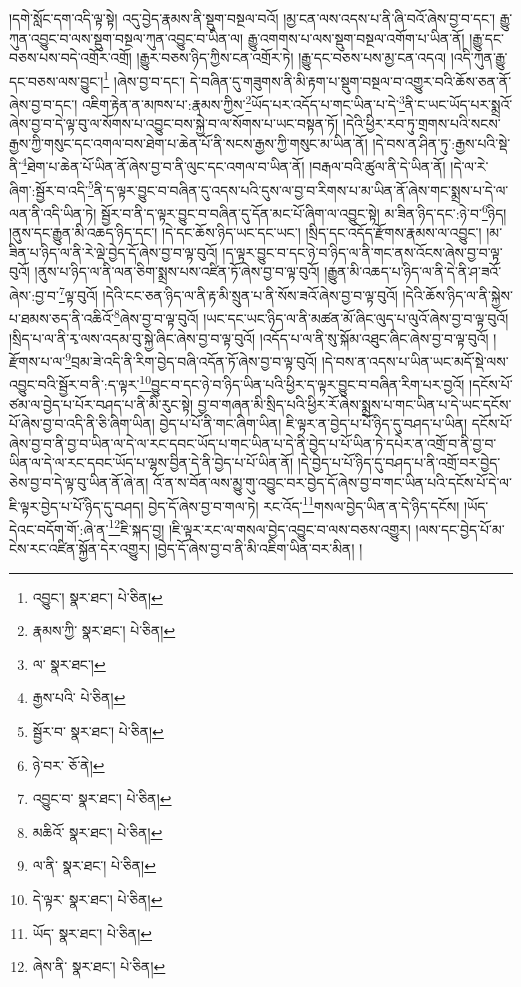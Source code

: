 །དགེ་སློང་དག་འདི་ལྟ་སྟེ། འདུ་བྱེད་རྣམས་ནི་སྡུག་བསྔལ་བའོ། །མྱ་ངན་ལས་འདས་པ་ནི་ཞི་བའོ་ཞེས་བྱ་བ་དང་། རྒྱུ་ཀུན་འབྱུང་བ་ལས་སྡུག་བསྔལ་ཀུན་འབྱུང་བ་ཡིན་ལ། རྒྱུ་འགགས་པ་ལས་སྡུག་བསྔལ་འགོག་པ་ཡིན་ནོ། །རྒྱུ་དང་བཅས་པས་བདེ་འགྲོར་འགྲོ། །རྒྱུར་བཅས་ཉིད་ཀྱིས་ངན་འགྲོར་ཏེ། །རྒྱུ་དང་བཅས་པས་མྱ་ངན་འདའ། །འདི་ཀུན་རྒྱུ་དང་བཅས་ལས་བྱུང་།\footnote{འབྱུང་།  སྣར་ཐང་།  པེ་ཅིན། } །ཞེས་བྱ་བ་དང་། དེ་བཞིན་དུ་གཟུགས་ནི་མི་རྟག་པ་སྡུག་བསྔལ་བ་འགྱུར་བའི་ཆོས་ཅན་ནོ་ཞེས་བྱ་བ་དང་། འཇིག་རྟེན་ན་མཁས་པ་:རྣམས་ཀྱིས་\footnote{རྣམས་ཀྱི་  སྣར་ཐང་།  པེ་ཅིན། }ཡོད་པར་འདོད་པ་གང་ཡིན་པ་དེ་\footnote{ལ་  སྣར་ཐང་། }ནི་ང་ཡང་ཡོད་པར་སྨྲའོ་ཞེས་བྱ་བ་དེ་ལྟ་བུ་ལ་སོགས་པ་འབྱུང་བས་སྐྱེ་བ་ལ་སོགས་པ་ཡང་བསྟན་ཏོ། །དེའི་ཕྱིར་རབ་ཏུ་གྲགས་པའི་སངས་རྒྱས་ཀྱི་གསུང་དང་འགལ་བས་ཐེག་པ་ཆེན་པོ་ནི་སངས་རྒྱས་ཀྱི་གསུང་མ་ཡིན་ནོ། །དེ་བས་ན་ཤིན་ཏུ་:རྒྱས་པའི་སྡེ་ནི་\footnote{རྒྱས་པའི་  པེ་ཅིན། }ཐེག་པ་ཆེན་པོ་ཡིན་ནོ་ཞེས་བྱ་བ་ནི་ལུང་དང་འགལ་བ་ཡིན་ནོ། །བརྒལ་བའི་ཚུལ་ནི་དེ་ཡིན་ནོ། །དེ་ལ་རེ་ཞིག་:སྦྱོར་བ་འདི་\footnote{སྦྱོར་བ་  སྣར་ཐང་།  པེ་ཅིན། }ནི་ད་ལྟར་བྱུང་བ་བཞིན་དུ་འདས་པའི་དུས་ལ་བྱ་བ་རིགས་པ་མ་ཡིན་ནོ་ཞེས་གང་སྨྲས་པ་དེ་ལ་ལན་ནི་འདི་ཡིན་ཏེ། སྦྱོར་བ་ནི་ད་ལྟར་བྱུང་བ་བཞིན་དུ་དོན་མང་པོ་ཞིག་ལ་འབྱུང་སྟེ། མ་ཟིན་ཉིད་དང་:ཉེ་བ་\footnote{ཉེ་བར་  ཅོ་ནེ། }ཉིད། །ནུས་དང་རྒྱུན་མི་འཆད་ཉིད་དང་། །དེ་དང་ཆོས་ཉིད་ཡང་དང་ཡང་། །སྲིད་དང་འདོད་རྫོགས་རྣམས་ལ་འབྱུང་། །མ་ཟིན་པ་ཉིད་ལ་ནི་རེ་ལྡེ་བྱེད་དོ་ཞེས་བྱ་བ་ལྟ་བུའོ། །ད་ལྟར་བྱུང་བ་དང་ཉེ་བ་ཉིད་ལ་ནི་གང་ནས་འོངས་ཞེས་བྱ་བ་ལྟ་བུའོ། །ནུས་པ་ཉིད་ལ་ནི་ལན་ཅིག་སྨྲས་པས་འཛིན་ཏོ་ཞེས་བྱ་བ་ལྟ་བུའོ། །རྒྱུན་མི་འཆད་པ་ཉིད་ལ་ནི་དེ་ནི་ཤ་ཟའོ་ཞེས་:བྱ་བ་\footnote{འབྱུང་བ་  སྣར་ཐང་།  པེ་ཅིན། }ལྟ་བུའོ། །དེའི་ངང་ཅན་ཉིད་ལ་ནི་རྟ་མི་སྲུན་པ་ནི་སོས་ཟའོ་ཞེས་བྱ་བ་ལྟ་བུའོ། །དེའི་ཆོས་ཉིད་ལ་ནི་སྐྱེས་པ་ཐམས་ཅད་ནི་འཆིའོ་\footnote{མཆིའོ་  སྣར་ཐང་།  པེ་ཅིན། }ཞེས་བྱ་བ་ལྟ་བུའོ། །ཡང་དང་ཡང་ཉིད་ལ་ནི་མཚན་མོ་ཞིང་ལུད་པ་ལུའོ་ཞེས་བྱ་བ་ལྟ་བུའོ། །སྲིད་པ་ལ་ནི་རྭ་ལས་འདམ་བུ་སྐྱེ་ཞིང་ཞེས་བྱ་བ་ལྟ་བུའོ། །འདོད་པ་ལ་ནི་སུ་སྐོམ་འཐུང་ཞིང་ཞེས་བྱ་བ་ལྟ་བུའོ། །རྫོགས་པ་ལ་\footnote{ལ་ནི་  སྣར་ཐང་།  པེ་ཅིན། }བྲམ་ཟེ་འདི་ནི་རིག་བྱེད་བཞི་འདོན་ཏོ་ཞེས་བྱ་བ་ལྟ་བུའོ། །དེ་བས་ན་འདས་པ་ཡིན་ཡང་མདོ་སྡེ་ལས་འབྱུང་བའི་སྦྱོར་བ་ནི་:ད་ལྟར་\footnote{དེ་ལྟར་  སྣར་ཐང་།  པེ་ཅིན། }བྱུང་བ་དང་ཉེ་བ་ཉིད་ཡིན་པའི་ཕྱིར་ད་ལྟར་བྱུང་བ་བཞིན་རིག་པར་བྱའོ། །དངོས་པོ་ཙམ་ལ་བྱེད་པ་པོར་བཤད་པ་ནི་མི་རུང་སྟེ། བྱ་བ་གཞན་མི་སྲིད་པའི་ཕྱིར་རོ་ཞེས་སྨྲས་པ་གང་ཡིན་པ་དེ་ཡང་དངོས་པོ་ཞེས་བྱ་བ་འདི་ནི་ཅི་ཞིག་ཡིན། བྱེད་པ་པོ་ནི་གང་ཞིག་ཡིན། ཇི་ལྟར་ན་བྱེད་པ་པོ་ཉིད་དུ་བཤད་པ་ཡིན། དངོས་པོ་ཞེས་བྱ་བ་ནི་བྱ་བ་ཡིན་ལ་དེ་ལ་རང་དབང་ཡོད་པ་གང་ཡིན་པ་དེ་ནི་བྱེད་པ་པོ་ཡིན་ཏེ་དཔེར་ན་འགྲོ་བ་ནི་བྱ་བ་ཡིན་ལ་དེ་ལ་རང་དབང་ཡོད་པ་ལྷས་བྱིན་དེ་ནི་བྱེད་པ་པོ་ཡིན་ནོ། །དེ་བྱེད་པ་པོ་ཉིད་དུ་བཤད་པ་ནི་འགྲོ་བར་བྱེད་ཅེས་བྱ་བ་དེ་ལྟ་བུ་ཡིན་ནོ་ཞེ་ན། འོ་ན་ས་བོན་ལས་མྱུ་གུ་འབྱུང་བར་བྱེད་དོ་ཞེས་བྱ་བ་གང་ཡིན་པའི་དངོས་པོ་དེ་ལ་ཇི་ལྟར་བྱེད་པ་པོ་ཉིད་དུ་བཤད། བྱེད་དོ་ཞེས་བྱ་བ་གལ་ཏེ། རང་འོད་\footnote{ཡོད་  སྣར་ཐང་།  པེ་ཅིན། }གསལ་བྱེད་ཡིན་ན་དེ་ཉིད་དངོས། །ཡོད་དེའང་བདོག་གོ་:ཞེ་ན་\footnote{ཞེས་ནི་  སྣར་ཐང་།  པེ་ཅིན། }ཇི་སྐད་བྱ། །ཇི་ལྟར་རང་ལ་གསལ་བྱེད་འབྱུང་བ་ལས་བཅས་འགྱུར། །ལས་དང་བྱེད་པོ་མ་ངེས་རང་འཛིན་སྐྱོན་དེར་འགྱུར། །བྱེད་དོ་ཞེས་བྱ་བ་ནི་མི་འཇིག་ཡིན་བར་མིན། །
